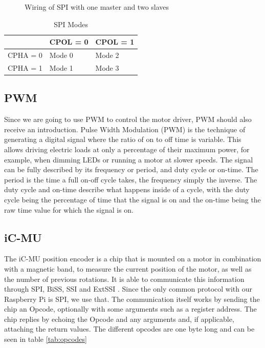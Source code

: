 \begin{figure}[H]
    \begin{center}
        
        \caption{Wiring of SPI with one master and two slaves}
        \label{fig:spi}
    \end{center}
\end{figure}

\begin{table}[H]
    \begin{tabular}{|l|l|l|}
        \hline
                 & CPOL = 0 & CPOL = 1 \\ \hline
        CPHA = 0 & Mode 0   & Mode 2   \\ \hline
        CPHA = 1 & Mode 1   & Mode 3   \\ \hline
    \end{tabular}
    \caption{SPI Modes}
    \label{tab:spi_modes}
\end{table}

\subsection{PWM}
\label{sec:background:hardware:pwm}

Since we are going to use PWM to control the motor driver, PWM should also receive an introduction.
Pulse Width Modulation (PWM) \cite[p. 187]{MarwedelPeter2021SS} is the technique of generating a digital signal where the ratio of on to off time is variable.
This allows driving electric loads at only a percentage of their maximum power,
for example, when dimming LEDs or running a motor at slower speeds.
The signal can be fully described by its frequency or period, and duty cycle or on-time.
The period is the time a full on-off cycle takes, the frequency simply the inverse.
The duty cycle and on-time describe what happens inside of a cycle,
with the duty cycle being the percentage of time that the signal is on and the on-time being the raw time value for which the signal is on.

\subsection{iC-MU}
\label{sec:background:hardware:ic-mu}

The iC-MU position encoder is a chip that is mounted on a motor in combination with a magnetic band, to measure the current position of the motor,
as well as the number of previous rotations.
It is able to communicate this information through SPI, BiSS, SSI and ExtSSI \cite{IC-MU}.
Since the only common protocol with our Raspberry Pi is SPI, we use that.
The communication itself works by sending the chip an Opcode, optionally with some arguments such as a register address.
The chip replies by echoing the Opcode and any arguments and, if applicable, attaching the return values.
The different opcodes are one byte long and can be seen in table \ref{tab:opcodes}


